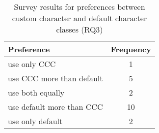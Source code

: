 \begin{table}
\caption{Survey results for preferences between custom character and default character classes (RQ3) \label{tab:cccvsdefault}}
\begin{center}
\begin{small}
\begin{tabular}{l|c}
\toprule
\textbf{Preference} & \textbf{Frequency} \\  \midrule \bigstrut
use only CCC & 1\\ \midrule \bigstrut
use CCC more than default & 5 \\ \midrule \bigstrut
use both equally & 2\\ \midrule \bigstrut
use default more than CCC & 10\\ \midrule \bigstrut
use only default & 2\\
\bottomrule
\end{tabular}
\end{small}
\end{center}
\vspace{-12pt}
\end{table}
